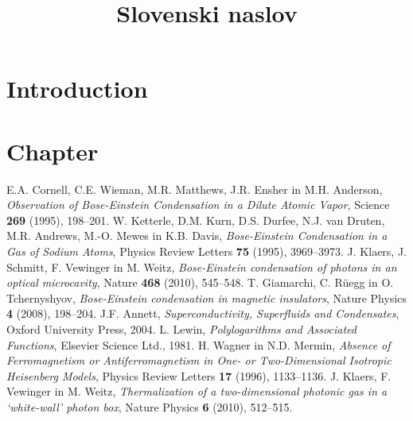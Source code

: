 \documentclass[twoside,11pt]{article}
\begin{document}





\klasifikacija{~} 
\title{Slovenski naslov}

\glava\baselineskip=14.5pt

\smallskip

\section{Introduction}

\section{Chapter}





\begin{thebibliography}{99}

 E.A. Cornell, C.E. Wieman, M.R. Matthews, J.R. Ensher in M.H. Anderson, \emph{Observation of Bose-Einstein Condensation in a Dilute Atomic Vapor}, Science \textbf{269} (1995), 198--201. 
 W. Ketterle, D.M. Kurn, D.S. Durfee, N.J. van Druten, M.R. Andrews, M.-O. Mewes in K.B. Davis, \emph{Bose-Einstein Condensation in a Gas of Sodium Atoms}, Physics Review Letters \textbf{75} (1995), 3969--3973. 
 J. Klaers, J. Schmitt, F. Vewinger in M. Weitz, \emph{Bose-Einstein condensation of photons in an optical microcavity}, Nature \textbf{468} (2010), 545--548. 
 T. Giamarchi, C. R\"uegg in O. Tchernyshyov, \emph{Bose-Einstein condensation in magnetic insulators}, Nature Physics \textbf{4} (2008), 198--204. 
 J.F. Annett, \emph{Superconductivity, Superfluids and Condensates}, Oxford University Press, 2004.
 L. Lewin, \emph{Polylogarithms and Associated Functions}, Elsevier Science Ltd., 1981. 
 H. Wagner in N.D. Mermin, \emph{Absence of Ferromagnetism or Antiferromagnetism in One- or Two-Dimensional Isotropic Heisenberg Models}, Physics Review Letters  \textbf{17} (1996), 1133--1136.
 J. Klaers, F. Vewinger in M. Weitz, \emph{Thermalization of a two-dimensional photonic gas in a ‘white-wall’ photon box}, Nature Physics \textbf{6} (2010), 512--515.

\end{thebibliography}
\end{document}

